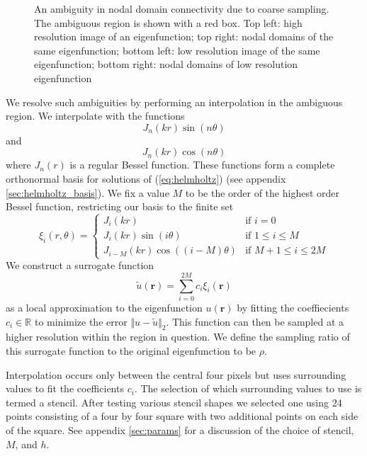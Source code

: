 \documentclass{report}
\newcommand{\rr}[0]{\mathbf{r}}
\begin{document}
\begin{figure}
\begin{center}
    \caption{An ambiguity in nodal domain connectivity due to coarse sampling. The ambiguous region is shown with a red box. Top left: high resolution image of an eigenfunction; top right: nodal domains of the same eigenfunction; bottom left: low resolution image of the same eigenfunction; bottom right: nodal domains of low resolution eigenfunction}
    \label{fig:interpolation_sample}
  \end{center}
\end{figure}

We resolve such ambiguities by performing an interpolation in the ambiguous region. We interpolate with the functions
\[
J_{n}(k r) \sin(n \theta)
\]
and
\[
J_{n}(k r) \cos(n \theta)
\]
where $J_{n}(r)$ is a regular Bessel function. These functions form a complete orthonormal basis for solutions of (\ref{eq:helmholtz}) (see appendix \ref{sec:helmholtz_basis}). We fix a value $M$ to be the order of the highest order Bessel function, restricting our basis to the finite set
\begin{equation}
  \label{eq:interp_functions}
  \xi_{i}(r, \theta)=\begin{cases}
  J_{i}(k r) & \text{if }i=0\\
  J_{i}(k r)\sin(i\theta) & \text{if }1 \le i \le M\\
  J_{i-M}(k r)\cos((i-M)\theta) & \text{if }M+1 \le i \le 2M
  \end{cases}
\end{equation}
We construct a surrogate function
\[
  \tilde{u}(\rr) = \sum_{i=0}^{2M} c_{i} \xi_{i}(\rr)
\]
as a local approximation to the eigenfunction $u(\rr)$ by fitting the coeffiecients $c_{i} \in \mathbb{R}$ to minimize the error $\Vert u - \tilde{u} \Vert_{2}$. This function can then be sampled at a higher resolution within the region in question. We define the sampling ratio of this surrogate function to the original eigenfunction to be $\rho$.

Interpolation occurs only between the central four pixels but uses surrounding values to fit the coefficients $c_i$. The selection of which surrounding values to use is termed a stencil. After testing various stencil shapes we selected one using 24 points consisting of a four by four square with two additional points on each side of the square. See appendix \ref{sec:params} for a discussion of the choice of stencil, $M$, and $h$.
\end{document}
